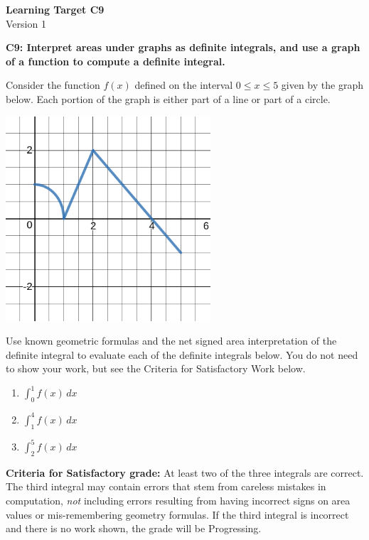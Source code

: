 \documentclass[10pt]{article}
\begin{document}
	\vspace*{0in}

		\begin{center}
			\textbf{Learning Target C9} \\
			{Version 1} \\
		\end{center}

\begin{framed}
	\textbf{C9: Interpret areas under graphs as definite integrals, and use a graph of a function to compute a definite integral.
}
\end{framed}

Consider the function $f(x)$ defined on the interval $0 \leq x \leq 5$ given by the graph below. Each portion of the graph is either part of a line or part of a circle. 

\begin{center}
    \includegraphics[width=3in]{c9-v1.png}
\end{center}

Use known geometric formulas and the net signed area interpretation of the definite integral to evaluate each of the definite integrals below. You do not need to show your work, but see the Criteria for Satisfactory Work below. 

\begin{enumerate}
    \item $\displaystyle{\int_0^1 f(x) \, dx}$
    \item $\displaystyle{\int_1^4 f(x) \, dx}$
    \item $\displaystyle{\int_2^5 f(x) \, dx}$
\end{enumerate}


\vfill


\begin{small}
    \begin{framed}
        	\textbf{Criteria for Satisfactory grade:} At least two of the three integrals are correct. The third integral may contain errors that stem from careless mistakes in computation, \emph{not} including errors resulting from having incorrect signs on area values or mis-remembering geometry formulas. If the third integral is incorrect and there is no work shown, the grade will be Progressing. 
    \end{framed}
\end{small}
\end{document}
